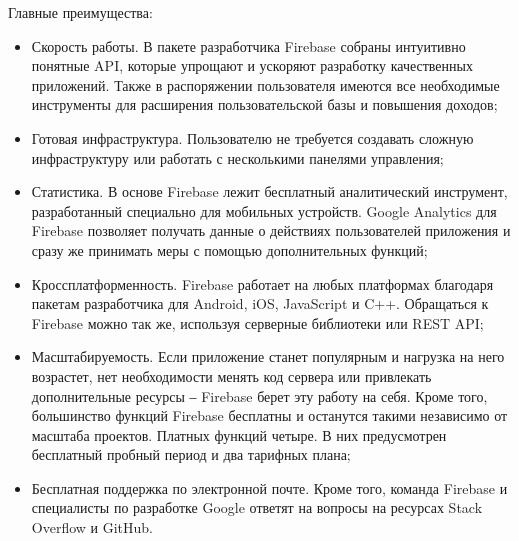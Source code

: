 Главные преимущества:
\begin{itemize}
    \item Скорость работы.
    В пакете разработчика Firebase собраны интуитивно понятные API, которые упрощают и ускоряют разработку качественных приложений.
    Также в распоряжении пользователя имеются все необходимые инструменты для расширения пользовательской базы и повышения доходов;
    \item Готовая инфраструктура.
    Пользователю не требуется создавать сложную инфраструктуру или работать с несколькими панелями управления;
    \item Статистика.
     В основе Firebase лежит бесплатный аналитический инструмент, разработанный специально для мобильных устройств.
     Google Analytics для Firebase позволяет получать данные о действиях пользователей приложения и сразу же принимать меры с помощью дополнительных функций;
    \item Кроссплатформенность.
    Firebase работает на любых платформах благодаря пакетам разработчика для Android, iOS, JavaScript и C++.
    Обращаться к Firebase можно так же, используя серверные библиотеки или REST API;
    \item Масштабируемость.
    Если приложение станет популярным и нагрузка на него возрастет, нет необходимости менять код сервера или привлекать дополнительные ресурсы ‒ Firebase берет эту работу на себя.
    Кроме того, большинство функций Firebase бесплатны и останутся такими независимо от масштаба проектов.
    Платных функций четыре. В них предусмотрен бесплатный пробный период и два тарифных плана;
    \item Бесплатная поддержка по электронной почте.
    Кроме того, команда Firebase и специалисты по разработке Google ответят на вопросы на ресурсах Stack Overflow и GitHub.
\end{itemize}
